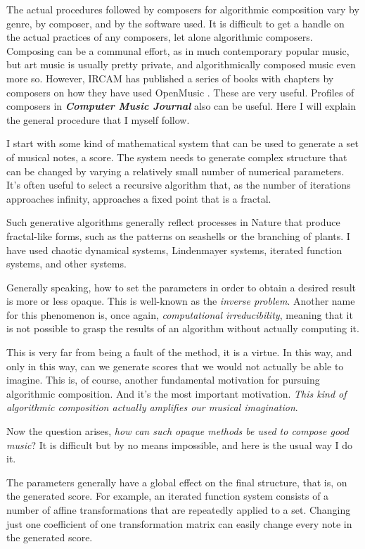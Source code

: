 \documentclass[11pt]{scrartcl}
\begin{document}
The actual procedures followed by composers for algorithmic composition vary by genre, by composer, and by the software used. It is difficult to get a handle on the actual practices of any composers, let alone algorithmic composers. Composing can be a communal effort, as in much contemporary popular music, but art music is usually pretty private, and algorithmically composed music even more so. However, IRCAM has published a series of books with chapters by composers on how they have used OpenMusic  \cite{omcomposersbook, agon2006om, agon2008om, agon2016om}. These are very useful. Profiles of composers in \emph{\textbf{Computer Music Journal}} also can be useful. Here I will explain the general procedure that I myself follow.

I start with some kind of mathematical system that can be used to generate a set of musical notes, a score. The system needs to generate complex structure that can be changed by varying a relatively small number of numerical parameters. It’s often useful to select a recursive algorithm that, as the number of iterations approaches infinity, approaches a fixed point that is a fractal.

Such generative algorithms generally reflect processes in Nature that produce fractal-like forms, such as the patterns on seashells or the branching of plants. I have used chaotic dynamical systems, Lindenmayer systems, iterated function systems, and other systems.

Generally speaking, how to set the parameters in order to obtain a desired result is more or less opaque. This is well-known as the \emph{inverse problem}. Another name for this phenomenon is, once again, \emph{computational irreducibility}, meaning that it is not possible to grasp the results of an algorithm without actually computing it.

This is very far from being a fault of the method, it is a virtue. In this way, and only in this way, can we generate scores that we would not actually be able to imagine. This is, of course, another fundamental motivation for pursuing algorithmic composition. And it's the most important motivation. \emph{This kind of algorithmic composition actually amplifies our musical imagination}.

Now the question arises, \emph{how can such opaque methods be used to compose good music}? It is difficult but by no means impossible, and here is the usual way I do it.

The parameters generally have a global effect on the final structure, that is, on the generated score. For example, an iterated function system consists of a number of affine transformations that are repeatedly applied to a set. Changing just one coefficient of one transformation matrix can easily change every note in the generated score.
\end{document}
